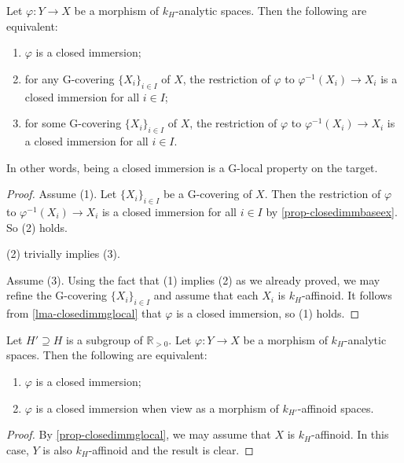 \begin{proposition}\label{prop-closedimmglocal}
    Let $\varphi:Y\rightarrow X$ be a morphism of $k_H$-analytic spaces. Then the following are equivalent:
    \begin{enumerate}
        \item $\varphi$ is a closed immersion;
        \item for any G-covering $\{X_i\}_{i\in I}$ of $X$, the restriction of $\varphi$ to $\varphi^{-1}(X_i)\rightarrow X_i$ is a closed immersion for all $i\in I$;
        \item for some G-covering $\{X_i\}_{i\in I}$ of $X$, the restriction of $\varphi$ to $\varphi^{-1}(X_i)\rightarrow X_i$ is a closed immersion for all $i\in I$.
    \end{enumerate}
\end{proposition}
In other words, being a closed immersion is a G-local property on the target.
\begin{proof}
    Assume (1). Let $\{X_i\}_{i\in I}$ be a G-covering of $X$. Then the restriction of $\varphi$ to $\varphi^{-1}(X_i)\rightarrow X_i$ is a closed immersion for all $i\in I$ by \cref{prop-closedimmbaseex}. So (2) holds.

    (2) trivially implies (3).

    Assume (3). Using the fact that (1) implies (2) as we already proved, we may refine the G-covering $\{X_i\}_{i\in I}$ and assume that each $X_i$ is $k_H$-affinoid. It follows from \cref{lma-closedimmglocal} that $\varphi$ is a closed immersion, so (1) holds.
\end{proof}
\begin{corollary}\label{cor-closedimmchangegroup}
    Let $H'\supseteq H$ is a subgroup of $\mathbb{R}_{>0}$. Let $\varphi:Y\rightarrow X$ be a morphism of $k_H$-analytic spaces. Then the following are equivalent:
    \begin{enumerate}
        \item $\varphi$ is a closed immersion;
        \item $\varphi$ is a closed immersion when view as a morphism of $k_{H'}$-affinoid spaces.
    \end{enumerate}
\end{corollary}
\begin{proof}
    By \cref{prop-closedimmglocal}, we may assume that $X$ is $k_H$-affinoid. In this case, $Y$ is also $k_H$-affinoid and the result is clear.
\end{proof}

